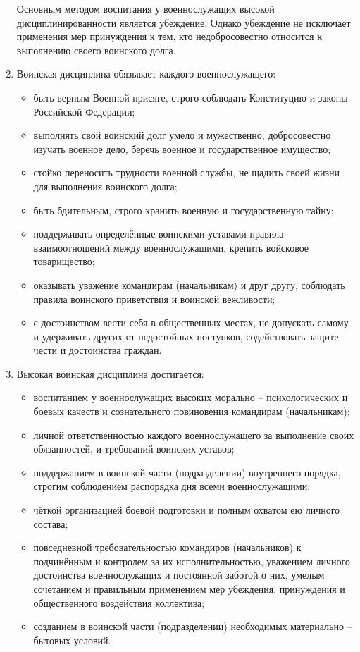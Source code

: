 \documentclass[12pt,a4paper]{report}
\begin{document}
\begin{enumerate}
   Основным  методом  воспитания  у  военнослужащих  высокой  дисциплинированности  является  убеждение.  Однако  убеждение  не  исключает  применения  мер  принуждения  к  тем,  кто  недобросовестно  относится  к  выполнению  своего  воинского  долга.
\item  Воинская  дисциплина  обязывает  каждого  военнослужащего:
\begin{itemize}
\item быть  верным  Военной  присяге,  строго  соблюдать  Конституцию  и  законы  Российской  Федерации;
\item выполнять  свой  воинский  долг  умело  и   мужественно,  добросовестно  изучать  военное  дело,  беречь  военное  и  государственное  имущество;
\item стойко  переносить  трудности  военной  службы,  не  щадить  своей  жизни  для выполнения  воинского  долга;
\item быть  бдительным,  строго  хранить  военную  и  государственную  тайну;
\item  поддерживать  определённые  воинскими  уставами  правила  взаимоотношений  между  военнослужащими,  крепить  войсковое  товарищество;
\item  оказывать  уважение  командирам (начальникам)  и  друг  другу,  соблюдать  правила  воинского  приветствия  и  воинской  вежливости;
\item  с  достоинством  вести  себя  в  общественных  местах,  не  допускать  самому  и  удерживать  других от  недостойных  поступков,  содействовать  защите  чести  и  достоинства  граждан.  
\end{itemize}    
\item Высокая  воинская  дисциплина  достигается:
\begin{itemize}
\item  воспитанием  у  военнослужащих  высоких  морально – психологических  и  боевых  качеств  и  сознательного  повиновения  командирам (начальникам);
\item личной  ответственностью  каждого  военнослужащего  за  выполнение  своих  обязанностей,  и  требований  воинских  уставов;
\item  поддержанием  в  воинской  части  (подразделении)  внутреннего  порядка,  строгим  соблюдением  распорядка  дня  всеми  военнослужащими;
\item  чёткой  организацией  боевой  подготовки  и  полным  охватом  ею  личного  состава;
\item   повседневной  требовательностью  командиров (начальников)  к  подчинённым  и  контролем  за  их  исполнительностью,  уважением  личного  достоинства  военнослужащих  и  постоянной  заботой  о  них,  умелым  сочетанием  и  правильным  применением  мер  убеждения,  принуждения  и  общественного  воздействия  коллектива;
\item созданием  в  воинской  части (подразделении)  необходимых  материально – бытовых  условий.
\end{itemize}
\end{enumerate}
\end{document}

